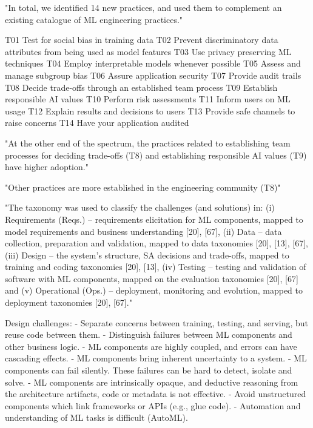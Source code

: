"In total, we identified 14 new practices, and used them
to complement an existing catalogue of ML engineering practices."

T01 Test for social bias in training data
T02 Prevent discriminatory data attributes from being used as model features
T03 Use privacy preserving ML techniques
T04 Employ interpretable models whenever possible
T05 Assess and manage subgroup bias
T06 Assure application security
T07 Provide audit trails
T08 Decide trade-offs through an established team process
T09 Establish responsible AI values
T10 Perform risk assessments
T11 Inform users on ML usage
T12 Explain results and decisions to users
T13 Provide safe channels to raise concerns
T14 Have your application audited

"At the other end of the spectrum, the practices related to
establishing team processes for deciding trade-offs (T8) and
establishing responsible AI values (T9) have higher adoption."

"Other practices are more established in the engineering community (T8)"


\parencite{Serban2021PracticesApplications}

"The taxonomy was used to classify the challenges (and solutions) in: (i)
Requirements (Reqs.) – requirements elicitation for ML components, mapped to
model requirements and business understanding [20], [67], (ii) Data – data
collection, preparation and validation, mapped to data taxonomies [20], [13],
[67], (iii) Design – the system’s structure, SA decisions and trade-offs, mapped
to training and coding taxonomies [20], [13], (iv) Testing – testing and
validation of software with ML components, mapped on the evaluation taxonomies
[20], [67] and (v) Operational (Ops.) – deployment, monitoring and evolution,
mapped to deployment taxonomies [20], [67]."

Design challenges:
- Separate concerns between training, testing, and serving,
  but reuse code between them.
- Distinguish failures between ML components and other business logic.
- ML components are highly coupled, and errors can have cascading effects.
- ML components bring inherent uncertainty to a system.
- ML components can fail silently. These failures can be
  hard to detect, isolate and solve.
- ML components are intrinsically opaque, and deductive reasoning
  from the architecture artifacts, code or metadata is not effective.
- Avoid unstructured components which link frameworks or APIs (e.g., glue code).
- Automation and understanding of ML tasks is difficult (AutoML).

